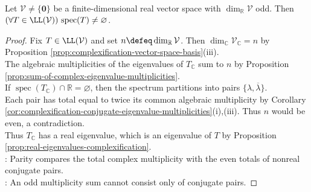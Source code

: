 \begin{corollary} \label{cor:odd-dimensional-real-operator-has-eigenvalue} \\
Let $\mathcal{V}\neq\{\mathbf{0}\}$ be a finite-dimensional real vector space with $\dim_{\mathbb{R}}\mathcal{V}$ odd. Then $(\forall T\in\LL(\mathcal{V}))\,\operatorname{spec}(T)\neq\varnothing$.
\begin{proof}
Fix $T\in\LL(\mathcal{V})$ and set $n\defeq\dim_{\mathbb{R}}\mathcal{V}$. Then $\dim_{\mathbb{C}}\mathcal{V}_{\mathbb{C}}=n$ by Proposition \ref{prop:complexification-vector-space-basis}(iii).\\
The algebraic multiplicities of the eigenvalues of $T_{\mathbb{C}}$ sum to $n$ by Proposition \ref{prop:sum-of-complex-eigenvalue-multiplicities}.\\
If $\operatorname{spec}(T_{\mathbb{C}})\cap\mathbb{R}=\varnothing$, then the spectrum partitions into pairs $\{\lambda,\overline{\lambda}\}$.\\
Each pair has total equal to twice its common algebraic multiplicity by Corollary \ref{cor:complexification-conjugate-eigenvalue-multiplicities}(i),(iii). Thus $n$ would be even, a contradiction.\\
Thus $T_{\mathbb{C}}$ has a real eigenvalue, which is an eigenvalue of $T$ by Proposition \ref{prop:real-eigenvalues-complexification}.\\
: Parity compares the total complex multiplicity with the even totals of nonreal conjugate pairs.\\
: An odd multiplicity sum cannot consist only of conjugate pairs.
\end{proof}
\end{corollary}


